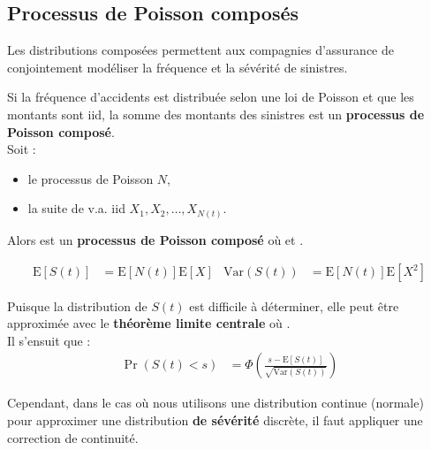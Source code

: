 \documentclass[10pt, french]{article}
\begin{document}
\begin{multicols*}{2}
\subsection{Processus de Poisson composés}
\begin{definitionNOHFILL}
\begin{rappel_enhanced}[Contexte]
Les distributions composées permettent aux compagnies d'assurance de conjointement modéliser la fréquence et la sévérité de sinistres.
\end{rappel_enhanced}
Si la fréquence d'accidents est distribuée selon une loi de Poisson et que les montants sont iid, la somme des montants des sinistres est un \textbf{processus de Poisson composé}.	\\

Soit :
\begin{itemize}
	\item	le processus de Poisson $N$,
	\item	la suite de v.a. iid $X_{1}, X_{2}, \dots, X_{N(t)}$.
\end{itemize}

Alors  est un \textbf{processus de Poisson composé} où  et .
\end{definitionNOHFILL}

\begin{definitionNOHFILLsub}
\begin{align*}
	\text{E}[S(t)]	
	&=	\text{E}[N(t)] \text{E}[X]		&
	\text{Var}(S(t))
	&=	\text{E}[N(t)] \text{E}[X^{2}]		
\end{align*}
\end{definitionNOHFILLsub}

\begin{definitionNOHFILLprop}
Puisque la distribution de $S(t)$ est difficile à déterminer, elle peut être approximée avec le \textbf{théorème limite centrale} où .\\

Il s'ensuit que :
\begin{align*}
	\Pr(S(t) < s)
	&=	\Phi\left(\frac{s - \text{E}[S(t)]}{\sqrt{\text{Var}(S(t))}}\right)
\end{align*}

Cependant, dans le cas où nous utilisons une distribution continue (normale) pour approximer une distribution \textbf{de sévérité} discrète, il faut appliquer une correction de continuité.
\end{definitionNOHFILLprop}


\end{multicols*}
\end{document}
